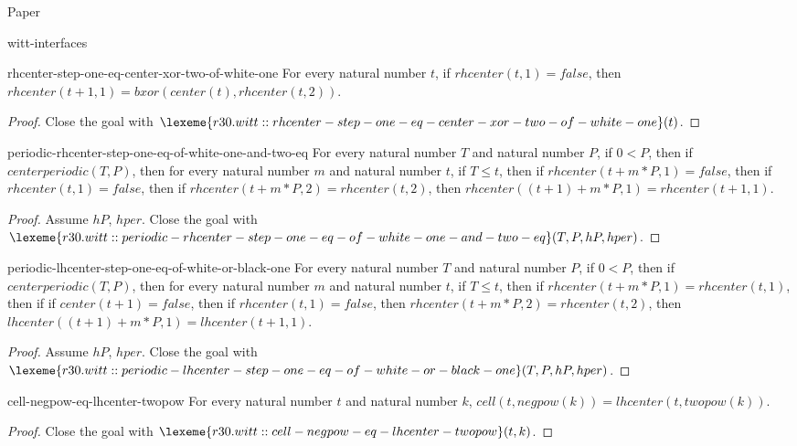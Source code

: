 \begin{lexlean}{Paper}
\begin{section}{witt-interfaces}
  \begin{theorem}{rhcenter-step-one-eq-center-xor-two-of-white-one}
  For every natural number \(t\), if \(rhcenter(t, 1) = false\), then \(rhcenter(t + 1, 1) = bxor(center(t), rhcenter(t, 2))\).
  \begin{proof}
  Close the goal with \(\lexeme{r30.witt::rhcenter-step-one-eq-center-xor-two-of-white-one}(t)\).
  \end{proof}
  \end{theorem}

  \begin{theorem}{periodic-rhcenter-step-one-eq-of-white-one-and-two-eq}
  For every natural number \(T\) and natural number \(P\), if \(0 < P\), then if \(centerperiodic(T, P)\), then for every natural number \(m\) and natural number \(t\), if \(T ≤ t\), then if \(rhcenter(t + m * P, 1) = false\), then if \(rhcenter(t, 1) = false\), then if \(rhcenter(t + m * P, 2) = rhcenter(t, 2)\), then \(rhcenter((t + 1) + m * P, 1) = rhcenter(t + 1, 1)\).
  \begin{proof}
  Assume \(hP\), \(hper\).
  Close the goal with \(\lexeme{r30.witt::periodic-rhcenter-step-one-eq-of-white-one-and-two-eq}(T, P, hP, hper)\).
  \end{proof}
  \end{theorem}

  \begin{theorem}{periodic-lhcenter-step-one-eq-of-white-or-black-one}
  For every natural number \(T\) and natural number \(P\), if \(0 < P\), then if \(centerperiodic(T, P)\), then for every natural number \(m\) and natural number \(t\), if \(T ≤ t\), then if \(rhcenter(t + m * P, 1) = rhcenter(t, 1)\), then if if \(center(t + 1) = false\), then if \(rhcenter(t, 1) = false\), then \(rhcenter(t + m * P, 2) = rhcenter(t, 2)\), then \(lhcenter((t + 1) + m * P, 1) = lhcenter(t + 1, 1)\).
  \begin{proof}
  Assume \(hP\), \(hper\).
  Close the goal with \(\lexeme{r30.witt::periodic-lhcenter-step-one-eq-of-white-or-black-one}(T, P, hP, hper)\).
  \end{proof}
  \end{theorem}

  \begin{theorem}{cell-negpow-eq-lhcenter-twopow}
  For every natural number \(t\) and natural number \(k\), \(cell(t, negpow(k)) = lhcenter(t, twopow(k))\).
  \begin{proof}
  Close the goal with \(\lexeme{r30.witt::cell-negpow-eq-lhcenter-twopow}(t, k)\).
  \end{proof}
  \end{theorem}


\end{section}
\end{lexlean}
